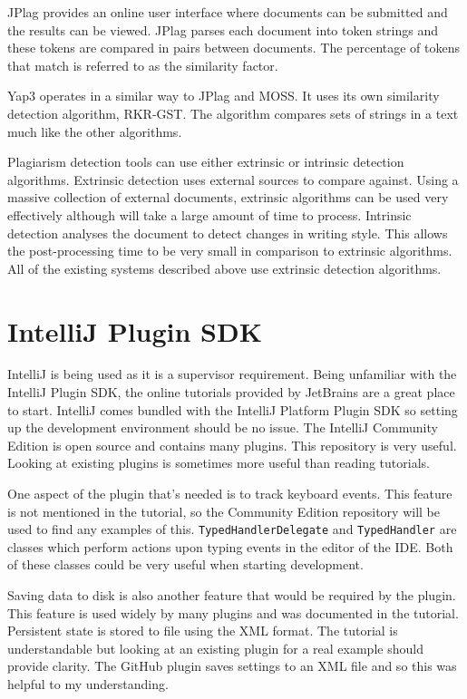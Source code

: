 JPlag provides an online user interface where documents can be submitted and the results can be viewed. JPlag parses each document into token strings and these tokens are compared in pairs between documents. The percentage of tokens that match is referred to as the similarity factor\cite{Prechelt2003}. 

Yap3 operates in a similar way to JPlag and MOSS. It uses its own similarity detection algorithm, RKR-GST. The algorithm compares sets of strings in a text much like the other algorithms\cite{Wise1996}.

Plagiarism detection tools can use either extrinsic or intrinsic detection algorithms. Extrinsic detection uses external sources to compare against. Using a massive collection of external documents, extrinsic algorithms can be used very effectively although will take a large amount of time to process. Intrinsic detection analyses the document to detect changes in writing style. This allows the post-processing time to be very small in comparison to extrinsic algorithms. All of the existing systems described above use extrinsic detection algorithms.

\section{IntelliJ Plugin SDK}
IntelliJ is being used as it is a supervisor requirement. Being unfamiliar with the IntelliJ Plugin SDK, the online tutorials provided by JetBrains\cite{IntelliJGettingStarted} are a great place to start. IntelliJ comes bundled with the IntelliJ Platform Plugin SDK so setting up the development environment should be no issue. The IntelliJ Community Edition is open source and contains many plugins\cite{IntelliJGitHub}. This repository is very useful. Looking at existing plugins is sometimes more useful than reading tutorials.

One aspect of the plugin that's needed is to track keyboard events. This feature is not mentioned in the tutorial, so the Community Edition repository will be used to find any examples of this. \texttt{TypedHandlerDelegate} and \texttt{TypedHandler} are classes which perform actions upon typing events in the editor of the IDE. Both of these classes could be very useful when starting development.

Saving data to disk is also another feature that would be required by the plugin. This feature is used widely by many plugins and was documented in the tutorial. Persistent state is stored to file using the XML format. The tutorial is understandable but looking at an existing plugin for a real example should provide clarity. The GitHub plugin saves settings to an XML file and so this was helpful to my understanding.

